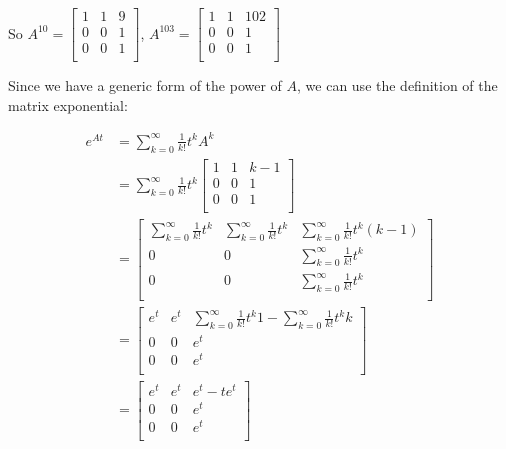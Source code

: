 \documentclass[11pt]{article}
\begin{document}
So $A^{10} = 
\begin{bmatrix}
    1 & 1 & 9 \\
    0 & 0 & 1 \\
    0 & 0 & 1 \\
\end{bmatrix}
$, $A^{103} = 
\begin{bmatrix}
    1 & 1 & 102 \\
    0 & 0 & 1 \\
    0 & 0 & 1 \\
\end{bmatrix}
$

Since we have a generic form of the power of $A$, we can use the definition of the matrix exponential:

\begin{align*}
    e^{At} &= \sum_{k=0} ^\infty \frac{1}{k!} t^k A^k \\
    &= \sum_{k=0} ^\infty \frac{1}{k!} t^k \begin{bmatrix}
        1 & 1 & k-1 \\
        0 & 0 & 1 \\
        0 & 0 & 1 \\
    \end{bmatrix}  \\
    &= \begin{bmatrix}
        \sum_{k=0} ^\infty \frac{1}{k!} t^k & \sum_{k=0} ^\infty \frac{1}{k!} t^k & \sum_{k=0} ^\infty \frac{1}{k!} t^k (k-1) \\
         0 &  0 & \sum_{k=0} ^\infty \frac{1}{k!} t^k \\
         0 &  0 & \sum_{k=0} ^\infty \frac{1}{k!} t^k \\
    \end{bmatrix} \\
    &= \begin{bmatrix}
        e^t & e^t & \sum_{k=0} ^\infty \frac{1}{k!} t^k 1 - \sum_{k=0} ^\infty \frac{1}{k!} t^k k  \\
        0 & 0 & e^t \\
        0 & 0 & e^t \\
    \end{bmatrix}\\
    &= \begin{bmatrix}
        e^t & e^t & e^t - t e^t  \\
        0 & 0 & e^t \\
        0 & 0 & e^t \\
    \end{bmatrix}
\end{align*}
\end{document}
